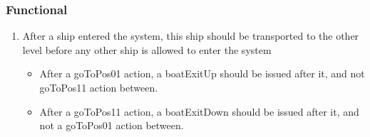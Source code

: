 \subsubsection*{Functional}
\begin{enumerate}
	\item After a ship entered the system, this ship should be transported to the other level before any other ship is allowed to enter the system
	\begin{itemize}
		\item After a goToPos01 action, a boatExitUp should be issued after it, and not goToPos11 action between.
		\item After a goToPos11 action, a boatExitDown should be issued after it, and not a goToPos01 action between.
	\end{itemize}
\end{enumerate}
